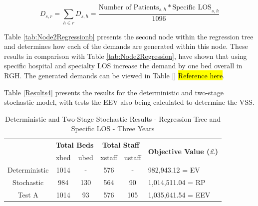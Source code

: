 \documentclass[../thesis.tex]{subfiles}
\begin{document}
\begin{equation}\label{eq:treedemand4}
        D_{s,r} = \sum\limits_{h \in r} D_{s,h} = \frac{\text{Number of Patients}_{s,h}*{\text{Specific LOS}_{s,h}}}{1096}
\end{equation}

Table \ref{tab:Node2Regressionb} presents the second node within the regression tree and determines how each of the demands are generated within this node. These results in comparison with Table \ref{tab:Node2Regression}, have shown that using specific hospital and specialty LOS increase the demand by one bed overall in RGH. The generated demands can be viewed in Table \ref{} \hl{Reference here}.

\begin{table}[h!]
    \centering{}
    \caption{Regression Tree Node 2 - Specific LOS}
    \label{tab:Node2Regressionb}
\end{table}

Table \ref{Results4} presents the results for the deterministic and two-stage stochastic model, with tests the EEV also being calculated to determine the VSS.

\begin{table}[h!]
    \centering
    \begin{tabular}{cccccl}\toprule
 & \multicolumn{2}{l}{\textbf{Total Beds}} & \multicolumn{2}{c}{\textbf{Total Staff}} & \multirow{2}{*}{\textbf{Objective Value ($\pounds$)}}\\ \cmidrule(lr){2-3} \cmidrule(lr){4-5}
 & xbed           & ubed          & xstaff         & ustaff         \\ \midrule
    Deterministic      & 1014 & - & 576 & - & 982,943.12 = EV \\ \midrule
    Stochastic &984& 130& 564 & 90&  1,014,511.04 = RP \\ \midrule
    Test A & 1014 & 93 & 576 & 105 & 1,035,641.54 = EEV \\\bottomrule
    \end{tabular}
    \caption{Deterministic and Two-Stage Stochastic Results - Regression Tree and Specific LOS - Three Years}
    \label{tab:Results4}
\end{table}
\end{document}
